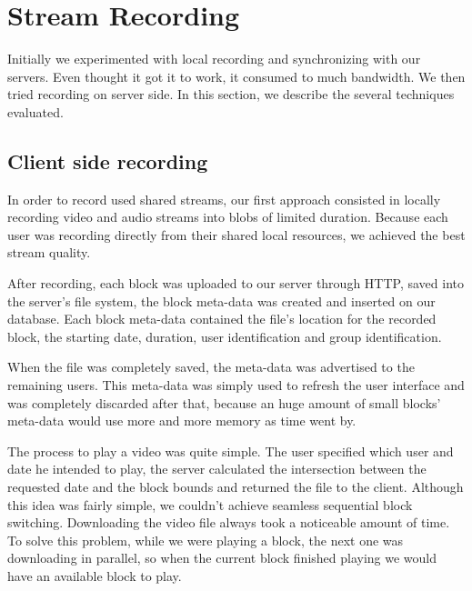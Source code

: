 \section{Stream Recording}
 Initially we experimented with local recording and synchronizing with our servers. Even thought it got it to work, it consumed to much bandwidth. We then tried recording on server side. In this section, we describe the several techniques evaluated.


\subsection{Client side recording}
In order to record used shared streams, our first approach consisted in locally recording video and audio streams into blobs of limited duration. Because each user was recording directly from their shared local resources, we achieved the best stream quality.

After recording, each block was uploaded to our server through \ac{HTTP}, saved into the server's file system, the block meta-data was created and inserted on our database. Each block meta-data contained the file's location for the recorded block, the starting date, duration, user identification and group identification.

When the file was completely saved, the meta-data was advertised to the remaining users. This meta-data was simply used to refresh the user interface and was completely discarded after that, because an huge amount of small blocks' meta-data would use more and more memory as time went by. 

	The process to play a video was quite simple. The user specified which user and date he intended to play, the server calculated the intersection between the requested date and the block bounds and returned the file to the client.
	Although this idea was fairly simple, we couldn't achieve seamless sequential block switching. Downloading the video file always took a noticeable amount of time. To solve this problem, while we were playing a block, the next one was downloading in parallel, so when the current block finished playing we would have an available block to play. 


